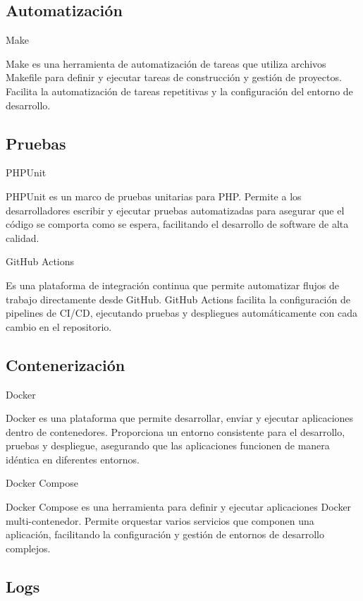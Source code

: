 \subsection*{Automatización}

Make

Make es una herramienta de automatización de tareas que utiliza archivos Makefile para definir y ejecutar tareas de
construcción y gestión de proyectos.
Facilita la automatización de tareas repetitivas y la configuración del entorno de desarrollo.

\subsection*{Pruebas}

PHPUnit

PHPUnit es un marco de pruebas unitarias para PHP. Permite a los desarrolladores escribir y ejecutar pruebas
automatizadas
para asegurar que el código se comporta como se espera, facilitando el desarrollo de software de alta calidad.

GitHub Actions

Es una plataforma de integración continua que permite automatizar flujos de trabajo directamente desde GitHub.
GitHub Actions facilita la configuración de pipelines de CI/CD, ejecutando pruebas y despliegues automáticamente con
cada cambio en el repositorio.

\subsection*{Contenerización}

Docker

Docker es una plataforma que permite desarrollar, enviar y ejecutar aplicaciones dentro de
contenedores.
Proporciona un entorno consistente para el desarrollo, pruebas y despliegue, asegurando que las aplicaciones funcionen
de manera idéntica en diferentes entornos.

Docker Compose

Docker Compose es una herramienta para definir y ejecutar aplicaciones Docker multi-contenedor.
Permite orquestar varios servicios que componen una aplicación, facilitando
la configuración y gestión de entornos de desarrollo complejos.

\subsection*{Logs}

